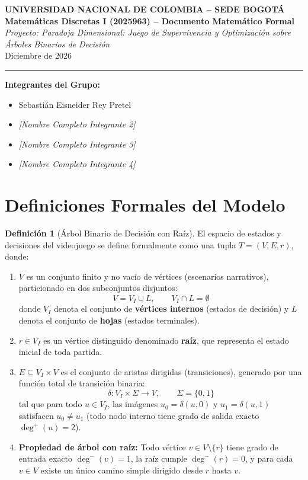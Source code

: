 \documentclass[11pt, a4paper]{article}
\theoremstyle{definition}
\newtheorem{definition}{Definición}[section]
\theoremstyle{plain}
\begin{document}
\begin{center}
    {\Large \textbf{UNIVERSIDAD NACIONAL DE COLOMBIA -- SEDE BOGOTÁ}} \\[4pt]
    \textbf{Matemáticas Discretas I (2025963) -- Documento Matemático Formal} \\[2pt]
    \textit{Proyecto: Paradoja Dimensional: Juego de Supervivencia y Optimización sobre Árboles Binarios de Decisión} \\[2pt]
    \small Diciembre de 2026
\end{center}

\hrule
\vspace{8pt}

\textbf{Integrantes del Grupo:}
\begin{itemize}[noitemsep, topsep=2pt]
    \item Sebastián Eisneider Rey Pretel
    \item \textit{[Nombre Completo Integrante 2]}
    \item \textit{[Nombre Completo Integrante 3]}
    \item \textit{[Nombre Completo Integrante 4]}
\end{itemize}

\section{Definiciones Formales del Modelo}

\begin{definition}[Árbol Binario de Decisión con Raíz]
El espacio de estados y decisiones del videojuego se define formalmente como una tupla $T = (V, E, r)$, donde:
\begin{enumerate}[noitemsep, topsep=2pt]
    \item $V$ es un conjunto finito y no vacío de vértices (escenarios narrativos), particionado en dos subconjuntos disjuntos:
    \[
        V = V_I \cup L, \qquad V_I \cap L = \emptyset
    \]
    donde $V_I$ denota el conjunto de \textbf{vértices internos} (estados de decisión) y $L$ denota el conjunto de \textbf{hojas} (estados terminales).
    \item $r \in V_I$ es un vértice distinguido denominado \textbf{raíz}, que representa el estado inicial de toda partida.
    \item $E \subseteq V_I \times V$ es el conjunto de aristas dirigidas (transiciones), generado por una función total de transición binaria:
    \[
        \delta: V_I \times \Sigma \to V, \qquad \Sigma = \{0, 1\}
    \]
    tal que para todo $u \in V_I$, las imágenes $u_0 = \delta(u, 0)$ y $u_1 = \delta(u, 1)$ satisfacen $u_0 \neq u_1$ (todo nodo interno tiene grado de salida exacto $\deg^+(u) = 2$).
    \item \textbf{Propiedad de árbol con raíz:} Todo vértice $v \in V \setminus \{r\}$ tiene grado de entrada exacto $\deg^-(v) = 1$, la raíz cumple $\deg^-(r) = 0$, y para cada $v \in V$ existe un único camino simple dirigido desde $r$ hasta $v$.
\end{enumerate}
\end{definition}
\end{document}
